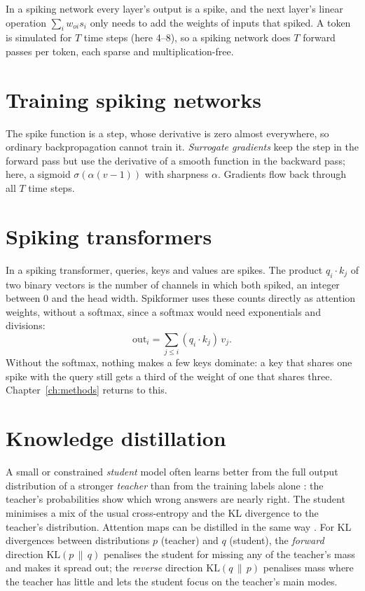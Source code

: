 In a spiking network every layer's output is a spike, and the next layer's linear operation
$\sum_i w_{oi} s_i$ only needs to add the weights of inputs that spiked. A token is simulated for $T$ time steps
(here 4--8), so a spiking network does $T$ forward passes per token, each sparse and multiplication-free.

\section{Training spiking networks}

The spike function is a step, whose derivative is zero almost everywhere, so ordinary backpropagation cannot train
it. \emph{Surrogate gradients} \citep{neftci2019surrogate} keep the step in the forward pass but use the derivative
of a smooth function in the backward pass; here, a sigmoid $\sigma(\alpha(v-1))$ with sharpness $\alpha$.
Gradients flow back through all $T$ time steps.

\section{Spiking transformers}

In a spiking transformer, queries, keys and values are spikes. The product $q_i \cdot k_j$ of two binary vectors is
the number of channels in which both spiked, an integer between 0 and the head width. Spikformer
\citep{zhou2023spikformer} uses these counts directly as attention weights, without a softmax, since a softmax
would need exponentials and divisions:
\begin{equation}
  \mathrm{out}_i = \sum_{j \le i} (q_i \cdot k_j)\, v_j .
\end{equation}
Without the softmax, nothing makes a few keys dominate: a key that shares one spike with the query still gets a
third of the weight of one that shares three. Chapter~\ref{ch:methods} returns to this.

\section{Knowledge distillation}

A small or constrained \emph{student} model often learns better from the full output distribution of a stronger
\emph{teacher} than from the training labels alone \citep{hinton2015distilling}: the teacher's probabilities show
which wrong answers are nearly right. The student minimises a mix of the usual cross-entropy and the KL divergence
to the teacher's distribution. Attention maps can be distilled in the same way \citep{jiao2020tinybert,
wang2020minilm}. For KL divergences between distributions $p$ (teacher) and $q$ (student), the \emph{forward}
direction $\mathrm{KL}(p\,\|\,q)$ penalises the student for missing any of the teacher's mass and makes it spread
out; the \emph{reverse} direction $\mathrm{KL}(q\,\|\,p)$ penalises mass where the teacher has little and lets the
student focus on the teacher's main modes.

